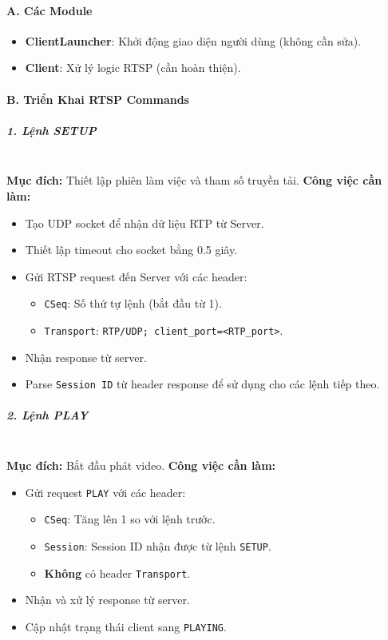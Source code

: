 \paragraph{A. Các Module}
\begin{itemize}
    \item \textbf{ClientLauncher}: Khởi động giao diện người dùng (không cần sửa).
    \item \textbf{Client}: Xử lý logic RTSP (cần hoàn thiện).
\end{itemize}

\paragraph{B. Triển Khai RTSP Commands}
\subparagraph{1. Lệnh SETUP} \mbox{}\\
\textbf{Mục đích:} Thiết lập phiên làm việc và tham số truyền tải.
\newline
\textbf{Công việc cần làm:}
\begin{itemize}
    \item Tạo UDP socket để nhận dữ liệu RTP từ Server.
    \item Thiết lập timeout cho socket bằng 0.5 giây.
    \item Gửi RTSP request đến Server với các header:
    \begin{itemize}
        \item \texttt{CSeq}: Số thứ tự lệnh (bắt đầu từ 1).
        \item \texttt{Transport}: \texttt{RTP/UDP; client\_port=<RTP\_port>}.
    \end{itemize}
    \item Nhận response từ server.
    \item Parse \texttt{Session ID} từ header response để sử dụng cho các lệnh tiếp theo.
\end{itemize}

\subparagraph{2. Lệnh PLAY}\mbox{}\\
\textbf{Mục đích:} Bắt đầu phát video.
\newline
\textbf{Công việc cần làm:}
\begin{itemize}
    \item Gửi request \texttt{PLAY} với các header:
    \begin{itemize}
        \item \texttt{CSeq}: Tăng lên 1 so với lệnh trước.
        \item \texttt{Session}: Session ID nhận được từ lệnh \texttt{SETUP}.
        \item \textbf{Không} có header \texttt{Transport}.
    \end{itemize}
    \item Nhận và xử lý response từ server.
    \item Cập nhật trạng thái client sang \texttt{PLAYING}.
\end{itemize}

